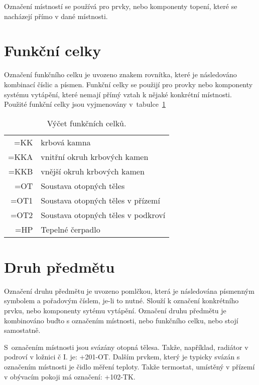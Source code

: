 \documentclass[a4paper,draft]{book}
\begin{document}
    

    Označení místností se používá pro prvky, nebo komponenty topení, které
    se nacházejí přímo v dané místnosti.


\section{Funkční celky}

    Označení funkčního celku je uvozeno znakem rovnítka, které je následováno
    kombinací číslic a písmen. Funkční celky se použijí pro provky nebo
    komponenty systému vytápění, které nemají přímý vztah k nějaké konkrétní
    místnosti. Použité funkční celky jsou vyjmenovány
    v~tabulce~\ref{tab:funkcni-celky}

    \begin{table}[h]
        \centering
        \begin{tabular}{r|l}
        \textsf{=KK} & krbová kamna\\
        =KKA & vnitřní okruh krbových kamen\\
        =KKB & vnější okruh krbových kamen\\
        =OT & Soustava otopných těles\\
        \textsf{=OT1} & Soustava otopných těles v přízemí\\
        =OT2 & Soustava otopných těles v podkroví\\
        =HP & Tepelné čerpadlo\\
        \end{tabular}
    \caption{Výčet funkčních celků.}
    \label{tab:funkcni-celky}
    \end{table}

\section{Druh předmětu}

    Označení druhu předmětu je uvozeno pomlčkou, která je následována
    písmenným symbolem a pořadovým číslem, je-li to nutné. Slouží k označení
    konkrétního prvku, nebo komponenty sytému vytápění. Označení druhu
    předmětu je kombinováno buďto s označením místnosti, nebo funkčního
    celku, nebo stojí samostatně.

    S~označením místnosti jsou svázány otopná tělesa. Takže, například,
    radiátor v podroví v ložnici č I. je: +201-OT. Dalším prvkem, který
    je typicky svázán s označením místnosti je čidlo měření teploty. Takže
    termostat, umístěný v přízemí v obývacím pokoji má označení: +102-TK.
\end{document}
